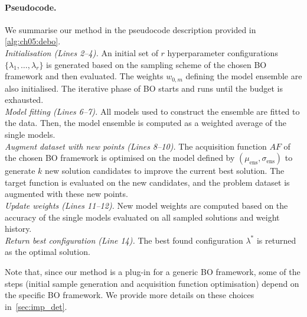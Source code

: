 \paragraph{Pseudocode.}
We summarise our method in the pseudocode description provided in \cref{alg:ch05:debo}. \\
\noindent\textit{Initialisation (Lines 2--4). }
An initial set of $r$ hyperparameter configurations 
$\{\lambda_1,\ldots,\lambda_r\}$ is generated based on the sampling scheme of the chosen BO framework and then evaluated. The weights $w_{0,m}$ defining the model ensemble are also initialised. The iterative phase of BO starts and runs until the budget is exhausted.\\
\noindent\textit{Model fitting (Lines 6--7).} 
All models used to construct the ensemble are fitted to the data. Then, the model ensemble is computed as a weighted average of the single models.\\ 
\noindent\textit{Augment dataset with new points (Lines 8--10). }
The acquisition function $AF$ of the chosen BO framework
is optimised 
on the model defined by $(\mu_\text{ens},\sigma_\text{ens})$
to generate $k$ new solution candidates to improve the current best solution. 
The target function is evaluated on the new candidates, and the problem dataset is augmented with these new points.\\
\noindent\textit{Update weights (Lines 11--12).}
New model weights are computed based on the accuracy of the single models evaluated on all sampled solutions and weight history.\\
\noindent\textit{Return best configuration (Line 14).}
The best found %
configuration $\lambda^*$ is returned as the optimal solution.

Note that, since our method is a plug-in for a generic BO framework, some of the steps (initial sample generation and acquisition function optimisation) depend on the specific BO framework.
We provide more details on these choices in~\cref{sec:imp_det}.

